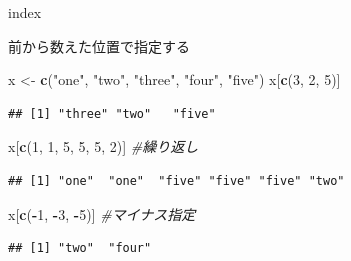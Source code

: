 \documentclass[ignorenonframetext,]{beamer}
\newenvironment{Shaded}{\begin{snugshade}}{\end{snugshade}}
\newcommand{\KeywordTok}[1]{\textcolor[rgb]{0.13,0.29,0.53}{\textbf{#1}}}
\newcommand{\DecValTok}[1]{\textcolor[rgb]{0.00,0.00,0.81}{#1}}
\newcommand{\StringTok}[1]{\textcolor[rgb]{0.31,0.60,0.02}{#1}}
\newcommand{\CommentTok}[1]{\textcolor[rgb]{0.56,0.35,0.01}{\textit{#1}}}
\newcommand{\OperatorTok}[1]{\textcolor[rgb]{0.81,0.36,0.00}{\textbf{#1}}}
\newcommand{\NormalTok}[1]{#1}
\begin{document}
\begin{frame}[fragile]{index}

前から数えた位置で指定する

\begin{Shaded}
\begin{Highlighting}[]
\NormalTok{x <-}\StringTok{ }\KeywordTok{c}\NormalTok{(}\StringTok{"one"}\NormalTok{, }\StringTok{"two"}\NormalTok{, }\StringTok{"three"}\NormalTok{, }\StringTok{"four"}\NormalTok{, }\StringTok{"five"}\NormalTok{)}
\NormalTok{x[}\KeywordTok{c}\NormalTok{(}\DecValTok{3}\NormalTok{, }\DecValTok{2}\NormalTok{, }\DecValTok{5}\NormalTok{)] }
\end{Highlighting}
\end{Shaded}

\begin{verbatim}
## [1] "three" "two"   "five"
\end{verbatim}

\begin{Shaded}
\begin{Highlighting}[]
\NormalTok{x[}\KeywordTok{c}\NormalTok{(}\DecValTok{1}\NormalTok{, }\DecValTok{1}\NormalTok{, }\DecValTok{5}\NormalTok{, }\DecValTok{5}\NormalTok{, }\DecValTok{5}\NormalTok{, }\DecValTok{2}\NormalTok{)] }\CommentTok{#繰り返し}
\end{Highlighting}
\end{Shaded}

\begin{verbatim}
## [1] "one"  "one"  "five" "five" "five" "two"
\end{verbatim}

\begin{Shaded}
\begin{Highlighting}[]
\NormalTok{x[}\KeywordTok{c}\NormalTok{(}\OperatorTok{-}\DecValTok{1}\NormalTok{, }\OperatorTok{-}\DecValTok{3}\NormalTok{, }\OperatorTok{-}\DecValTok{5}\NormalTok{)] }\CommentTok{#マイナス指定}
\end{Highlighting}
\end{Shaded}

\begin{verbatim}
## [1] "two"  "four"
\end{verbatim}

\end{frame}
\end{document}
